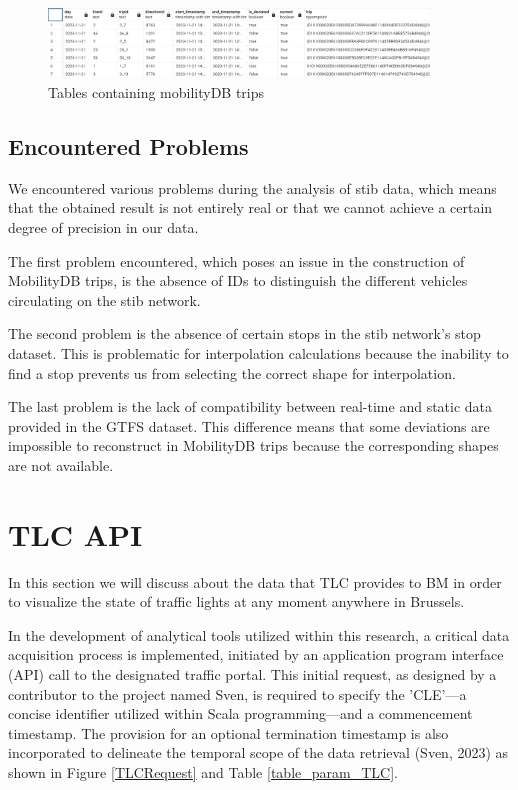 \documentclass[12pt]{report}
\begin{document}
	
	 
	 \begin{center}
	 	\begin{figure}
	 		\centering
	 		\includegraphics[width=0.9\textwidth]{images/stib_table_trips.png}
	 		\caption{Tables containing mobilityDB trips}
	 		\label{table_trips}
	 	\end{figure}
	 \end{center}
	 
	
	
	\subsection{Encountered Problems}
	\label{sec:EncouteredProblemsTIB}
	
	We encountered various problems during the analysis of \acrshort{stib} data, which means that the obtained result is not entirely real or that we cannot achieve a certain degree of precision in our data.
	
	The first problem encountered, which poses an issue in the construction of MobilityDB trips, is the absence of IDs to distinguish the different vehicles circulating on the \acrshort{stib} network.
	
	The second problem is the absence of certain stops in the \acrshort{stib} network's stop dataset. This is problematic for interpolation calculations because the inability to find a stop prevents us from selecting the correct shape for interpolation.
	
	The last problem is the lack of compatibility between real-time and static data provided in the GTFS dataset. This difference means that some deviations are impossible to reconstruct in MobilityDB trips because the corresponding shapes are not available.
	
	\section{TLC API}
	
	In this section we will discuss about the  data that TLC provides to BM in order to visualize the state of traffic lights at any moment anywhere in Brussels.
	
	In the development of analytical tools utilized within this research, a critical data acquisition process is implemented, initiated by an application program interface (API) call to the designated traffic portal. This initial request, as designed by a contributor to the project named Sven, is required to specify the 'CLE'—a concise identifier utilized within Scala programming—and a commencement timestamp. The provision for an optional termination timestamp is also incorporated to delineate the temporal scope of the data retrieval (Sven, 2023) as shown in Figure \ref{TLCRequest} and Table \ref{table_param_TLC}.
	
\end{document}
